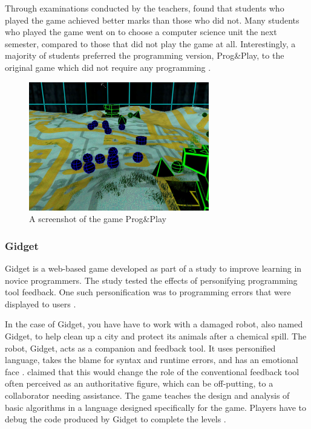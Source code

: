 \documentclass[a4paper,11.5pt]{report}
\numberwithin{figure}{section}
\numberwithin{table}{section}
\numberwithin{equation}{section}
\numberwithin{equation}{section}
\begin{document}
Through examinations conducted by the teachers, \citeauthor{muratet2011} found that students who played the game achieved better marks than those who did not. Many students who played the game went on to choose a computer science unit the next semester, compared to those that did not play the game at all. Interestingly, a majority of students preferred the programming version, Prog\&Play, to the original game which did not require any programming \citep{muratet2011}.

\begin{figure}[H]
 \centering
    \includegraphics[width=0.7\textwidth]{ProgAndPlay-Example}
       \captionsetup{justification=centering}
\caption{A screenshot of the game Prog\&Play {\citep{progplaywebsite}}}
\label{fig:ProgAndPlay-Example}
\end{figure}


\subsubsection*{Gidget}

Gidget is a web-based game developed as part of a study to improve learning in novice programmers. The study tested the effects of personifying programming tool feedback. One such personification was to programming errors that were displayed to users \citep{lee2011}. 

In the case of Gidget, you have have to work with a damaged robot, also named Gidget, to help clean up a city and protect its animals after a chemical spill. The robot, Gidget, acts as a companion and feedback tool. It uses personified language, takes the blame for syntax and runtime errors, and has an emotional face \citep{lee2011}. \citeauthor{lee2011} claimed that this would change the role of the conventional feedback tool often perceived as an authoritative figure, which can be off-putting, to a collaborator needing assistance. The game teaches the design and analysis of basic algorithms in a language designed specifically for the game. Players have to debug the code produced by Gidget to complete the levels \citep{lee2011}.
\end{document}
